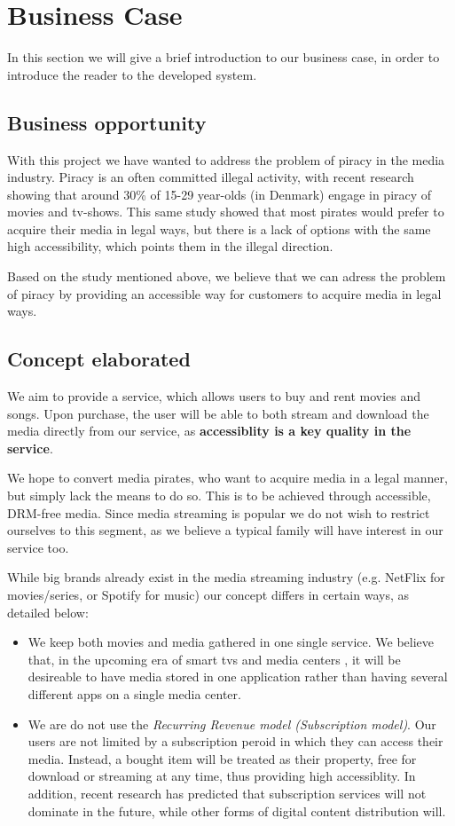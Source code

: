 \section{Business Case}
In this section we will give a brief introduction to our business case, in order to introduce the reader to the developed system.

\subsection{Business opportunity}
With this project we have wanted to address the problem of piracy in the media industry. Piracy is an often committed illegal activity, with recent research showing that around 30\% of 15-29 year-olds (in Denmark) engage in piracy of movies and tv-shows\cite{pirates}. This same study showed that most pirates would prefer to acquire their media in legal ways, but there is a lack of options with the same high accessibility, which points them in the illegal direction.

Based on the study mentioned above, we believe that we can adress the problem of piracy by providing an accessible way for customers to acquire media in legal ways.

\subsection{Concept elaborated}
We aim to provide a service, which allows users to buy and rent movies and songs. Upon purchase, the user will be able to both stream and download the media directly from our service, as \textbf{accessiblity is a key quality in the service}.

We hope to convert media pirates, who want to acquire media in a legal manner, but simply lack the means to do so. This is to be achieved through accessible, DRM-free media. Since media streaming is popular\cite{ott} we do not wish to restrict ourselves to this segment, as we believe a typical  family will have interest in our service too.

While big brands already exist in the media streaming industry (e.g. NetFlix for movies/series, or Spotify for music) our concept differs in certain ways, as detailed below:

\begin{itemize}
    \item We keep both movies and media gathered in one single service. We believe that, 
        in the upcoming era of smart tvs and media centers \cite{smarttv}, it will be
        desireable to have media stored in one application rather than having several
        different apps on a single media center.
    \item We are do not use the \emph{Recurring Revenue model (Subscription model)}\cite{businessmodel}. Our users are not limited by a subscription peroid in which they can access their media. Instead, a bought item will be treated as their property, free for download or streaming at any time, thus providing high accessiblity. In addition, recent research\cite{ott} has predicted that subscription services will not dominate in the future, while other forms of digital content distribution will.
\end{itemize}
    
